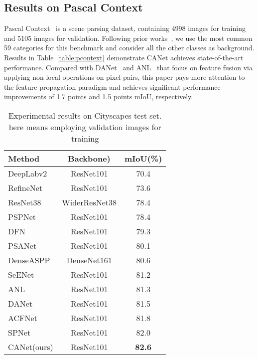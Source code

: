 \documentclass[journal]{IEEEtran}
\begin{document}
\subsection{Results on Pascal Context}
Pascal Context~\cite{mottaghi2014role} is a scene parsing dataset, containing 4998 images for training and 5105 images for validation. Following prior works~\cite{zhang2018context,yu2020context}, we use the most common 59 categories for this benchmark and consider all the other classes as background. Results in Table~\ref{table:pcontext} demonstrate CANet achieves state-of-the-art performance. Compared with DANet~\cite{fu2019dual} and ANL~\cite{zhu2019asymmetric} that focus on feature fusion via applying non-local operations on pixel pairs, this paper pays more attention to the feature propagation paradigm and achieves significant performance improvements of 1.7 points and 1.5 points mIoU, respectively.

\begin{table}
\caption{Experimental results on Cityscapes test set.  here means employing validation images for training}
\begin{center}
    \begin{tabular}{lc|c}
    \toprule
        \textbf{Method} & \textbf{Backbone)} & \textbf{mIoU(\%)} \\
    \midrule\midrule
        DeepLabv2~\cite{chen2017deeplab} & ResNet101 & 70.4 \\
        RefineNet~\cite{lin2017refinenet} & ResNet101 & 73.6 \\
        ResNet38~\cite{wu2019wider} & WiderResNet38 & 78.4 \\
        PSPNet~\cite{zhao2017pyramid} & ResNet101 & 78.4 \\
        DFN~\cite{yu2018learning}  & ResNet101 & 79.3 \\
        PSANet~\cite{zhao2018psanet} & ResNet101 & 80.1 \\
        DenseASPP~\cite{yang2018denseaspp} & DenseNet161 & 80.6 \\
        SeENet~\cite{pang2019towards} & ResNet101 & 81.2 \\
        ANL~\cite{zhu2019asymmetric} & ResNet101 & 81.3 \\
        DANet~\cite{fu2019dual} & ResNet101 & 81.5 \\
        ACFNet~\cite{zhang2019acfnet} & ResNet101 & 81.8 \\
        SPNet~\cite{hou2020strip} & ResNet101 & 82.0 \\
    \midrule
        CANet(ours) & ResNet101 & \textbf{82.6} \\
    \bottomrule
    \end{tabular}
\end{center}
\label{table:citys}
\end{table}
\end{document}
